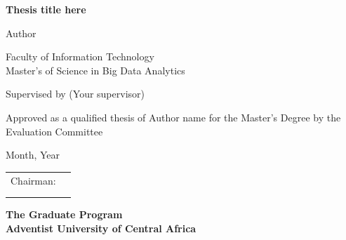 \begin{titlepage}
    \begin{center}
        \textbf{\huge Thesis title here \newline}  
		
        \textnormal{\Large Author}
        
        
        \textnormal{\large Faculty of Information Technology\\ Master's of Science in Big Data Analytics}
        
        \textnormal{\large Supervised by (Your supervisor)}
        
        \textnormal{\large Approved as a qualified thesis of Author name \newline }
        \textnormal{\large for the Master's Degree by the Evaluation Committee \newline}
        
        \textnormal{\large Month, Year}
        
        \begin{flushright}
        	\begin{tabular}{cl}
            \textnormal{Chairman}:	    & \underline{\makebox[2in][l]{}}\\ 
             							& \underline{\makebox[2in][l]{}}\\  
             							& \underline{\makebox[2in][l]{}}\\  
            							
                                       
                                                                                
            \end{tabular}
        \end{flushright}
        \vfill 
        
       \textbf{\Large The Graduate Program \\ Adventist University of Central Africa}
        \vfill               
    \end{center}
\end{titlepage}